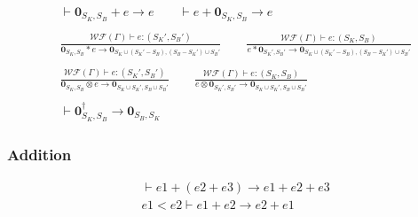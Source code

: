 \documentclass{article}
\begin{document}
\begin{align*}
  & \vdash \textbf{0}_{S_K, S_B} + e \to e
  \qquad \vdash e + \textbf{0}_{S_K, S_B} \to e\\
  &\ \\
  & \frac{\mathcal{WF}(\Gamma)\vdash e : (S_K', S_B')}{\textbf{0}_{S_K, S_B} * e \to \textbf{0}_{S_K \cup (S_K' - S_B), (S_B-S_K') \cup S_B'}}
  \qquad \frac{\mathcal{WF}(\Gamma)\vdash e : (S_K, S_B)}{e * \textbf{0}_{S_K', S_B'} \to \textbf{0}_{S_K \cup (S_K' - S_B), (S_B-S_K') \cup S_B'}}\\
  &\ \\
  & \frac{\mathcal{WF}(\Gamma)\vdash e : (S_K', S_B')}{\textbf{0}_{S_K, S_B} \otimes e \to \textbf{0}_{S_K \cup S_K', S_B \cup S_B'}}
  \qquad \frac{\mathcal{WF}(\Gamma)\vdash e : (S_K, S_B)}{e \otimes \textbf{0}_{S_K', S_B'} \to \textbf{0}_{S_K \cup S_K', S_B \cup S_B'}}\\
  &\ \\
  & \vdash \textbf{0}_{S_K, S_B}^\dagger \to \textbf{0}_{S_B, S_K}
\end{align*}

\subsubsection*{Addition}
\begin{align*}
  & \vdash e1 + (e2 + e3) \to e1 + e2 + e3 \\
  & e1 < e2 \vdash e1 + e2 \to e2 + e1
\end{align*}
\end{document}
